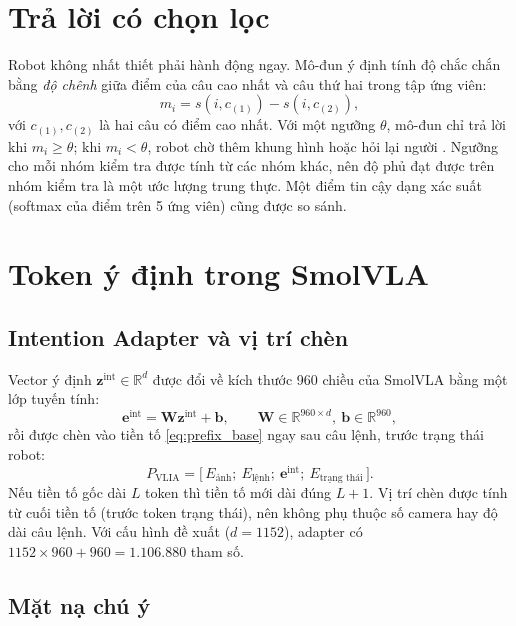 \documentclass[a4paper,oneside]{report}
\newcommand{\R}{\mathbb{R}}
\begin{document}
\section{Trả lời có chọn lọc}
\label{sec:selective_method}

Robot không nhất thiết phải hành động ngay. Mô-đun ý định tính độ chắc chắn bằng \textit{độ chênh} giữa điểm của câu cao nhất và câu thứ hai trong tập ứng viên:
\begin{equation}
  m_i = s(i,c_{(1)}) - s(i,c_{(2)}),
  \label{eq:margin}
\end{equation}
với $c_{(1)}, c_{(2)}$ là hai câu có điểm cao nhất. Với một ngưỡng $\theta$, mô-đun chỉ trả lời khi $m_i\geq\theta$; khi $m_i<\theta$, robot chờ thêm khung hình hoặc hỏi lại người \citep{chow1970optimum,geifman2017selective}. Ngưỡng cho mỗi nhóm kiểm tra được tính từ các nhóm khác, nên độ phủ đạt được trên nhóm kiểm tra là một ước lượng trung thực. Một điểm tin cậy dạng xác suất (softmax của điểm trên 5 ứng viên) cũng được so sánh.

\section{Token ý định trong SmolVLA}
\label{sec:intention_token}

\subsection{Intention Adapter và vị trí chèn}

Vector ý định $\mathbf{z}^{\mathrm{int}}\in\R^{d}$ được đổi về kích thước 960 chiều của SmolVLA bằng một lớp tuyến tính:
\begin{equation}
  \mathbf{e}^{\mathrm{int}} = \mathbf{W}\mathbf{z}^{\mathrm{int}} + \mathbf{b}, \qquad \mathbf{W}\in\R^{960\times d},\ \mathbf{b}\in\R^{960},
\end{equation}
rồi được chèn vào tiền tố \cref{eq:prefix_base} ngay sau câu lệnh, trước trạng thái robot:
\begin{equation}
  P_{\mathrm{VLIA}} = \big[\,E_{\text{ảnh}};\ E_{\text{lệnh}};\ \mathbf{e}^{\mathrm{int}};\ E_{\text{trạng thái}}\,\big].
\end{equation}
Nếu tiền tố gốc dài $L$ token thì tiền tố mới dài đúng $L+1$. Vị trí chèn được tính từ cuối tiền tố (trước token trạng thái), nên không phụ thuộc số camera hay độ dài câu lệnh. Với cấu hình đề xuất ($d=1152$), adapter có $1152\times960+960=1.106.880$ tham số.

\subsection{Mặt nạ chú ý}
\end{document}
